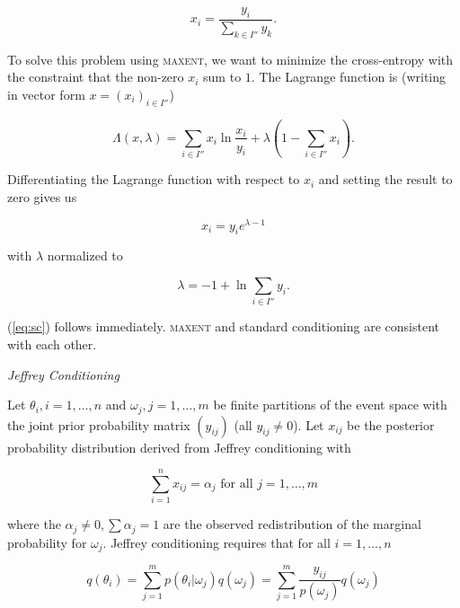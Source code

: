 \documentclass[11pt]{article}
\begin{document}
\begin{equation}
  \label{eq:sc}
  x_{i}=\frac{y_{i}}{\sum_{k\in{}I''}y_{k}}.
\end{equation}

To solve this problem using \textsc{maxent}, we want to minimize the
cross-entropy with the constraint that the non-zero $x_{i}$ sum to
$1$. The Lagrange function is (writing in vector form
$x=(x_{i})_{i\in{}I''}$)

\begin{equation}
  \label{eq:sclag}
  \Lambda(x,\lambda)=\sum_{i\in{}I''}x_{i}\ln\frac{x_{i}}{y_{i}}+\lambda\left(1-\sum_{i\in{}I''}x_{i}\right).
\end{equation}

Differentiating the Lagrange function with respect to $x_{i}$ and
setting the result to zero gives us

\begin{equation}
  \label{eq:sc1}
  x_{i}=y_{i}e^{\lambda-1}
\end{equation}

with $\lambda$ normalized to

\begin{equation}
  \label{eq:sc2}
  \lambda=-1+\ln{}\sum_{i\in{}I''}y_{i}.
\end{equation}

(\ref{eq:sc}) follows immediately. \textsc{maxent} and standard
conditioning are consistent with each other.

\medskip

{\noindent}\emph{Jeffrey Conditioning}

\medskip

{\noindent}Let $\theta_{i},i=1,\ldots,n$ and
$\omega_{j},j=1,\ldots,m$ be finite partitions of the event space with
the joint prior probability matrix $(y_{ij})$ (all $y_{ij}\neq{}0$).
Let $x_{ij}$ be the posterior probability distribution derived from
Jeffrey conditioning with 

\begin{equation}
  \label{eq:jc1}
  \sum_{i=1}^{n}x_{ij}=\alpha_{j}\mbox{ for all }j=1,\ldots,m
\end{equation}

where the $\alpha_{j}\neq{}0, \sum\alpha_{j}=1$ are the observed
redistribution of the marginal probability for $\omega_{j}$. Jeffrey
conditioning requires that for all $i=1,\ldots,n$

\begin{equation}
  \label{eq:jc2}
  q(\theta_{i})=\sum_{j=1}^{m}p(\theta_{i}|\omega_{j})q(\omega_{j})=\sum_{j=1}^{m}\frac{y_{ij}}{p(\omega_{j})}q(\omega_{j})
\end{equation}
\end{document}
